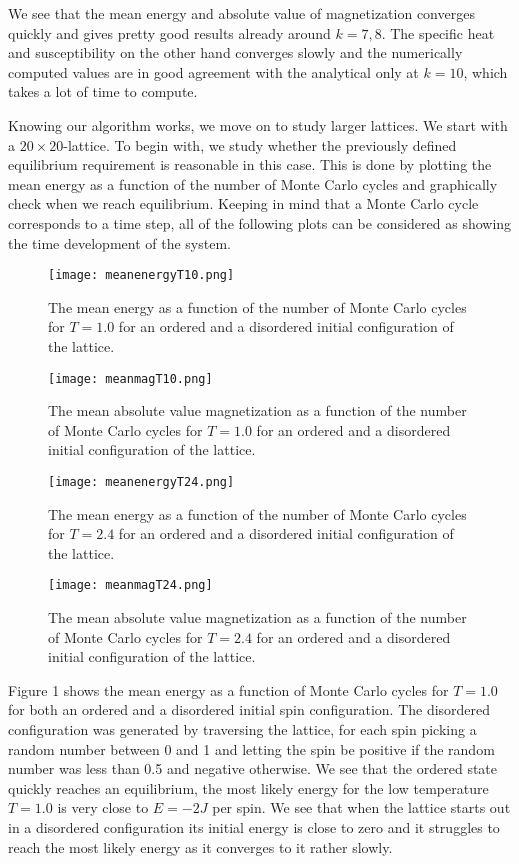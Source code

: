 \documentclass[english, 12pt]{article}
\begin{document}
We see that the mean energy and absolute value of magnetization converges quickly and gives pretty good results already around $k=7,8$. The specific heat and susceptibility on the other hand converges slowly and the numerically computed values are in good agreement with the analytical only at $k=10$, which takes a lot of time to compute.

Knowing our algorithm works, we move on to study larger lattices. We start with a $20\times20$-lattice. To begin with, we study whether the previously defined equilibrium requirement is reasonable in this case. This is done by plotting the mean energy as a function of the number of Monte Carlo cycles and graphically check when we reach equilibrium. Keeping in mind that a Monte Carlo cycle corresponds to a time step, all of the following plots can be considered as showing the time development of the system.


\begin{figure}[hbt!]
\centering
\texttt{[image: meanenergyT10.png]}
\caption{The mean energy as a function of the number of Monte Carlo cycles for $T=1.0$ for an ordered and a disordered initial configuration of the lattice.}
\end{figure}

\begin{figure}[hbt!]
\centering
\texttt{[image: meanmagT10.png]}
\caption{The mean absolute value magnetization as a function of the number of Monte Carlo cycles for $T=1.0$ for an ordered and a disordered initial configuration of the lattice.}
\end{figure}

\begin{figure}[hbt!]
\centering
\texttt{[image: meanenergyT24.png]}
\caption{The mean energy as a function of the number of Monte Carlo cycles for $T=2.4$ for an ordered and a disordered initial configuration of the lattice.}
\end{figure}

\begin{figure}[hbt!]
\centering
\texttt{[image: meanmagT24.png]}
\caption{The mean absolute value magnetization as a function of the number of Monte Carlo cycles for $T=2.4$ for an ordered and a disordered initial configuration of the lattice.}
\end{figure}

Figure 1 shows the mean energy as a function of Monte Carlo cycles for $T=1.0$ for both an ordered and a disordered initial spin configuration. The disordered configuration was generated by traversing the lattice, for each spin picking a random number between 0 and 1 and letting the spin be positive if the random number was less than 0.5 and negative otherwise. We see that the ordered state quickly reaches an equilibrium, the most likely energy for the low temperature $T=1.0$ is very close to $E = -2J$ per spin. We see that when the lattice starts out in a disordered configuration its initial energy is close to zero and it struggles to reach the most likely energy as it converges to it rather slowly.
\end{document}
